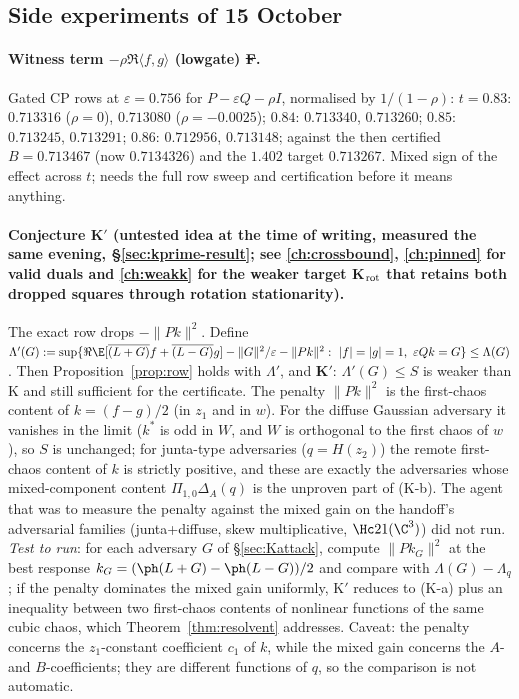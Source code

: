 \subsection{Side experiments of 15 October}
\paragraph{Witness term $-\rho\Re\langle f,g\rangle$ (lowgate) \st{F}.} Gated CP rows at $\varepsilon=0.756$ for $P-\varepsilon Q-\rho I$, normalised by $1/(1-\rho)$:
$t=0.83$: $0.713316$ ($\rho=0$), $0.713080$ ($\rho=-0.0025$); $0.84$: $0.713340$, $0.713260$; $0.85$: $0.713245$, $0.713291$; $0.86$: $0.712956$, $0.713148$; against the
then certified $B=0.713467$ (now $0.7134326$) and the $1.402$ target $0.713267$. Mixed sign of the effect across $t$; needs the full row sweep and certification before it means anything.
\paragraph{Conjecture K$'$ (untested idea at the time of writing, measured the same evening, \S\ref{sec:kprime-result}; see \autoref{ch:crossbound}, \autoref{ch:pinned} for valid duals and \autoref{ch:weakk} for the weaker target K$_{\rm rot}$ that retains both dropped squares through rotation stationarity).} The exact row drops $-\|Pk\|^2$. Define
$\Lambda'(G):=\sup\{\Re\E[\overline{(L+G)}f+\overline{(L-G)}g]-\|G\|^2/\varepsilon-\|Pk\|^2:\ |f|=|g|=1,\ \varepsilon Qk=G\}\le\Lambda(G)$. Then
Proposition~\ref{prop:row} holds with $\Lambda'$, and \textbf{K$'$}: $\Lambda'(G)\le S$ is weaker than K and still sufficient for the certificate. The penalty
$\|Pk\|^2$ is the first-chaos content of $k=(f-g)/2$ (in $z_1$ and in $w$). For the diffuse Gaussian adversary it vanishes in the limit ($k^*$ is odd in $W$, and $W$
is orthogonal to the first chaos of $w$), so $S$ is unchanged; for junta-type adversaries ($q=H(z_2)$) the remote first-chaos content of $k$ is strictly positive, and
these are exactly the adversaries whose mixed-component content $\Pi_{1,0}\Delta_A(q)$ is the unproven part of (K-b). The agent that was to measure the penalty against
the mixed gain on the handoff's adversarial families (junta+diffuse, skew multiplicative, $\Hc21(\C^3)$) did not run. \emph{Test to run}: for each adversary $G$ of
\S\ref{sec:Kattack}, compute $\|Pk_G\|^2$ at the best response $k_G=(\ph(L+G)-\ph(L-G))/2$ and compare with $\Lambda(G)-\Lambda_q$; if the penalty dominates the mixed gain
uniformly, K$'$ reduces to (K-a) plus an inequality between two first-chaos contents of nonlinear functions of the same cubic chaos, which Theorem~\ref{thm:resolvent}
addresses. Caveat: the penalty concerns the $z_1$-constant coefficient $c_1$ of $k$, while the mixed gain concerns the $A$- and $B$-coefficients; they are different
functions of $q$, so the comparison is not automatic.
